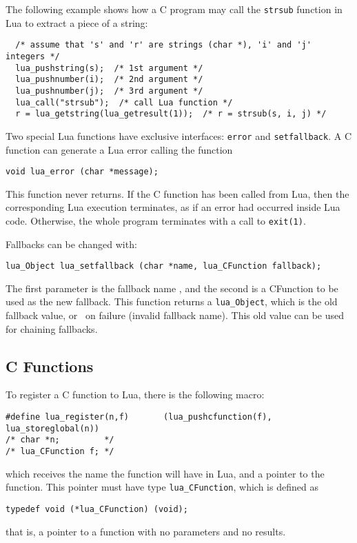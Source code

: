 The following example shows how a C program may call the
\verb|strsub| function in Lua to extract a piece of a string:
\begin{verbatim}
  /* assume that 's' and 'r' are strings (char *), 'i' and 'j' integers */
  lua_pushstring(s);  /* 1st argument */
  lua_pushnumber(i);  /* 2nd argument */
  lua_pushnumber(j);  /* 3rd argument */
  lua_call("strsub");  /* call Lua function */
  r = lua_getstring(lua_getresult(1));  /* r = strsub(s, i, j) */
\end{verbatim}

Two special Lua functions have exclusive interfaces:
\verb'error' and \verb'setfallback'.
A C function can generate a Lua error calling the function
\begin{verbatim}
void lua_error (char *message);
\end{verbatim}
This function never returns.
If the C function has been called from Lua,
then the corresponding Lua execution terminates,
as if an error had occurred inside Lua code.
Otherwise, the whole program terminates with a call to \verb|exit(1)|.

Fallbacks can be changed with:
\begin{verbatim}
lua_Object lua_setfallback (char *name, lua_CFunction fallback);
\end{verbatim}
The first parameter is the fallback name ,
and the second is a CFunction to be used as the new fallback.
This function returns a \verb'lua_Object',
which is the old fallback value,
or \nil\ on failure (invalid fallback name).
This old value can be used for chaining fallbacks.


\subsection{C Functions} \label{LuacallC}
To register a C function to Lua,
there is the following macro:
\begin{verbatim}
#define lua_register(n,f)       (lua_pushcfunction(f), lua_storeglobal(n))
/* char *n;         */
/* lua_CFunction f; */
\end{verbatim}
which receives the name the function will have in Lua,
and a pointer to the function.
This pointer must have type \verb'lua_CFunction',
which is defined as
\begin{verbatim}
typedef void (*lua_CFunction) (void);
\end{verbatim}
that is, a pointer to a function with no parameters and no results.

